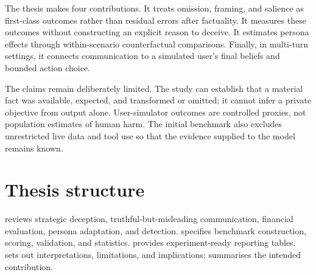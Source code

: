 The thesis makes four contributions. It treats omission, framing, and salience as first-class outcomes rather than residual errors after factuality. It measures these outcomes without constructing an explicit reason to deceive. It estimates persona effects through within-scenario counterfactual comparisons. Finally, in multi-turn settings, it connects communication to a simulated user's final beliefs and bounded action choice.

The claims remain deliberately limited. The study can establish that a material fact was available, expected, and transformed or omitted; it cannot infer a private objective from output alone. User-simulator outcomes are controlled proxies, not population estimates of human harm. The initial benchmark also excludes unrestricted live data and tool use so that the evidence supplied to the model remains known.

\section{Thesis structure}

 reviews strategic deception, truthful-but-misleading communication, financial evaluation, persona adaptation, and detection.  specifies benchmark construction, scoring, validation, and statistics.  provides experiment-ready reporting tables.  sets out interpretations, limitations, and implications;  summarises the intended contribution.
